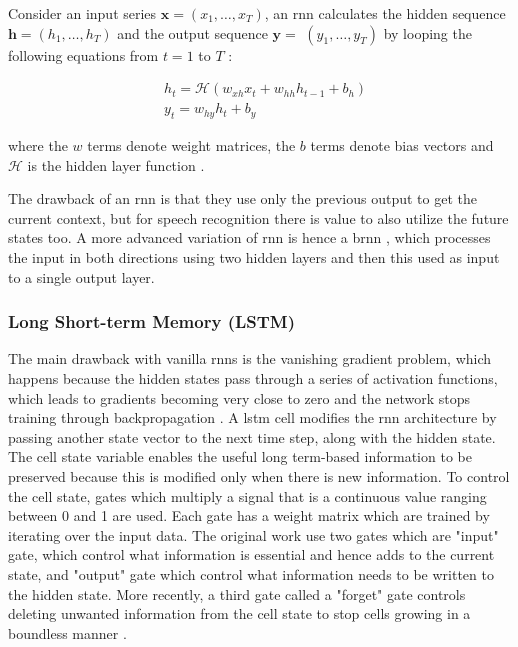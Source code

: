 Consider an input series $\boldsymbol{x}=\left(x_{1}, \ldots, x_{T}\right)$, an \acrshort{rnn} calculates the hidden sequence $\boldsymbol{h}=\left(h_{1}, \ldots, h_{T}\right)$ and the output sequence $\boldsymbol{y}=$ $\left(y_{1}, \ldots, y_{T}\right)$ by looping the following equations from $t=1$ to $T$ :

$$
\begin{aligned}
&h_{t}=\mathcal{H}\left(w_{xh} x_{t}+w_{hh} h_{t-1}+b_{h}\right) \\
&y_{t}=w_{h y} h_{t}+b_{y}
\end{aligned}
$$

where the $w$ terms denote weight matrices, the $b$ terms denote bias vectors and $\mathcal{H}$ is the hidden layer function \cite{Graves2013SpeechNetworks}.

The drawback of an \acrshort{rnn} is that they use only the previous output to get the current context, but for speech recognition there is value to also utilize the future states too. A more advanced variation of \acrshort{rnn} is hence a \acrfull{brnn} \cite{Schuster1997BidirectionalNetworks}, which processes the input in both directions using two hidden layers and then this used as input to a single output layer. 

\subsubsection{Long Short-term Memory (LSTM)}
The main drawback with vanilla \acrshort{rnn}s is the vanishing gradient problem, which happens because the hidden states pass through a series of  activation functions, which leads to gradients becoming very close to zero and the network stops training through backpropagation \cite{Hochreiter1997LongMemory}. A \acrfull{lstm} cell \cite{Hochreiter1997LongMemory} modifies the \acrshort{rnn} architecture by passing another state vector to the next time step, along with the hidden state. The cell state variable enables the useful long term-based information to be preserved because this is modified only when there is new information. To control the cell state, gates which multiply a signal that is a continuous value ranging between 0 and 1 are used. Each gate has a weight matrix which are trained by iterating over the input data. The original work use two gates which are "input" gate, which control what information is essential and hence adds to the current state, and "output" gate which control what information needs to be written to the hidden state. More recently, a third gate called a "forget" gate controls deleting unwanted information from the cell state to stop cells growing in a boundless manner \cite{Gers2000LearningLSTM}.

